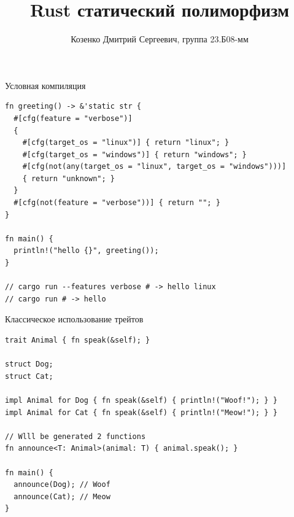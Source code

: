 \documentclass[aspectratio=169]{beamer}
\title[Rust статический полиморфизм]
{Rust статический полиморфизм}
\institute[СПбГУ]{}
\author[Дмитрий Козенко]{Козенко Дмитрий Сергеевич, группа 23.Б08-мм}
\begin{document}
\begin{frame}[fragile]{Условная компиляция}
\begin{verbatim}
fn greeting() -> &'static str {
  #[cfg(feature = "verbose")]
  {
    #[cfg(target_os = "linux")] { return "linux"; }
    #[cfg(target_os = "windows")] { return "windows"; }
    #[cfg(not(any(target_os = "linux", target_os = "windows")))]
    { return "unknown"; }
  }
  #[cfg(not(feature = "verbose"))] { return ""; }
}

fn main() {
  println!("hello {}", greeting());
}

// cargo run --features verbose # -> hello linux
// cargo run # -> hello
\end{verbatim}
\end{frame}


\begin{frame}[fragile]{Классическое использование трейтов}
\begin{verbatim}
trait Animal { fn speak(&self); }

struct Dog;
struct Cat;

impl Animal for Dog { fn speak(&self) { println!("Woof!"); } }
impl Animal for Cat { fn speak(&self) { println!("Meow!"); } }

// Wlll be generated 2 functions
fn announce<T: Animal>(animal: T) { animal.speak(); }

fn main() {
  announce(Dog); // Woof
  announce(Cat); // Meow
}
\end{verbatim}
\end{frame}

\end{document}
